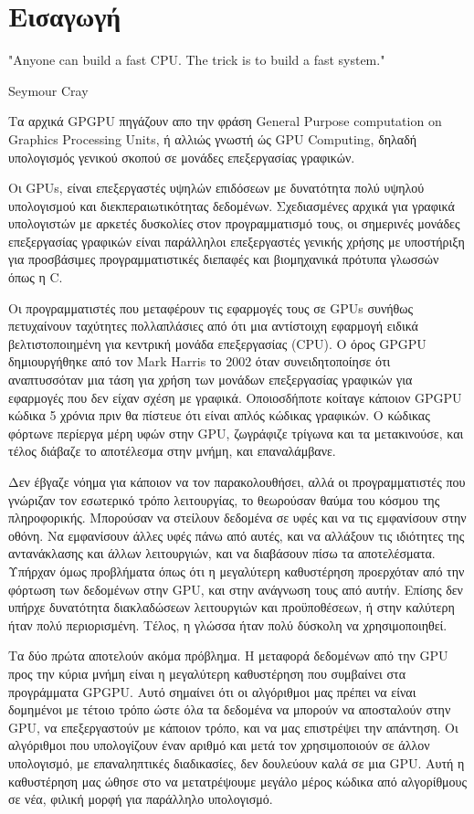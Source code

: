 \chapter{Εισαγωγή}
\epigraph{"Anyone can build a fast CPU. The trick is to build a fast system."}{Seymour Cray}

Τα αρχικά GPGPU πηγάζουν απο την φράση General Purpose computation on Graphics Processing Units, ή αλλιώς γνωστή ώς GPU Computing, δηλαδή υπολογισμός γενικού σκοπού σε μονάδες επεξεργασίας γραφικών.

Οι GPUs, είναι επεξεργαστές υψηλών επιδόσεων με δυνατότητα πολύ υψηλού υπολογισμού και διεκπεραιωτικότητας δεδομένων. Σχεδιασμένες αρχικά για γραφικά υπολογιστών με αρκετές δυσκολίες στον προγραμματισμό τους, οι σημερινές μονάδες επεξεργασίας γραφικών είναι παράλληλοι επεξεργαστές γενικής χρήσης με υποστήριξη για προσβάσιμες προγραμματιστικές διεπαφές και βιομηχανικά πρότυπα γλωσσών όπως η C.

Οι προγραμματιστές που μεταφέρουν τις εφαρμογές τους σε GPUs συνήθως πετυχαίνουν ταχύτητες πολλαπλάσιες από ότι μια αντίστοιχη εφαρμογή ειδικά βελτιστοποιημένη για κεντρική μονάδα επεξεργασίας (CPU).
Ο όρος GPGPU δημιουργήθηκε από τον Mark Harris το 2002 όταν συνειδητοποίησε ότι αναπτυσσόταν μια τάση για χρήση των μονάδων επεξεργασίας γραφικών για εφαρμογές που δεν είχαν σχέση με γραφικά. 
Οποιοσδήποτε κοίταγε κάποιον GPGPU κώδικα 5 χρόνια πριν θα πίστευε ότι είναι απλός κώδικας γραφικών. Ο κώδικας φόρτωνε περίεργα μέρη υφών στην GPU, ζωγράφιζε τρίγωνα και τα μετακινούσε, και τέλος διάβαζε το αποτέλεσμα στην μνήμη, και επαναλάμβανε.\cite{gpgpu-1}

Δεν έβγαζε νόημα για κάποιον να τον παρακολουθήσει, αλλά οι προγραμματιστές που γνώριζαν τον εσωτερικό τρόπο λειτουργίας, το θεωρούσαν θαύμα του κόσμου της πληροφορικής. Μπορούσαν να στείλουν δεδομένα σε υφές και να τις εμφανίσουν στην οθόνη. Να εμφανίσουν άλλες υφές πάνω από αυτές, και να αλλάξουν τις ιδιότητες της αντανάκλασης και άλλων λειτουργιών, και να διαβάσουν πίσω τα αποτελέσματα. Υπήρχαν όμως προβλήματα όπως ότι η μεγαλύτερη καθυστέρηση προερχόταν από την φόρτωση των δεδομένων στην GPU, και στην ανάγνωση τους από αυτήν. Επίσης δεν υπήρχε δυνατότητα διακλαδώσεων λειτουργιών και προϋποθέσεων, ή στην καλύτερη ήταν πολύ περιορισμένη. Τέλος, η γλώσσα ήταν πολύ δύσκολη να χρησιμοποιηθεί. 

Τα δύο πρώτα αποτελούν ακόμα πρόβλημα. Η μεταφορά δεδομένων από την GPU προς την κύρια μνήμη είναι η μεγαλύτερη καθυστέρηση που συμβαίνει στα προγράμματα GPGPU. Αυτό σημαίνει ότι οι αλγόριθμοι μας πρέπει να είναι δομημένοι με τέτοιο τρόπο ώστε όλα τα δεδομένα να μπορούν να αποσταλούν στην GPU, να επεξεργαστούν με κάποιον τρόπο, και να μας επιστρέψει την απάντηση. Οι αλγόριθμοι που υπολογίζουν έναν αριθμό και μετά τον χρησιμοποιούν σε άλλον υπολογισμό, με επαναληπτικές διαδικασίες, δεν δουλεύουν καλά σε μια GPU. Αυτή η καθυστέρηση μας ώθησε στο να μετατρέψουμε μεγάλο μέρος κώδικα από αλγορίθμους σε νέα, φιλική μορφή για παράλληλο υπολογισμό. 

